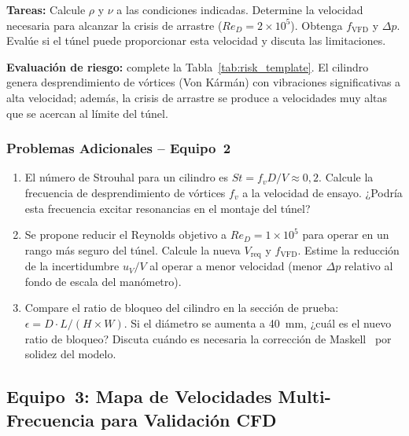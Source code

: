 \documentclass[12pt,a4paper]{article}
\begin{document}
\textbf{Tareas:} Calcule $\rho$ y $\nu$ a las condiciones indicadas.
Determine la velocidad necesaria para alcanzar la crisis de arrastre
($Re_D = 2\times10^5$).  Obtenga $f_\mathrm{VFD}$ y $\Delta p$.  Evalúe
si el túnel puede proporcionar esta velocidad y discuta las limitaciones.

\textbf{Evaluación de riesgo:} complete la Tabla~\ref{tab:risk_template}.
El cilindro genera desprendimiento de vórtices (Von Kármán) con vibraciones
significativas a alta velocidad; además, la crisis de arrastre se produce
a velocidades muy altas que se acercan al límite del túnel.

\subsubsection*{Problemas Adicionales -- Equipo~2}

\begin{enumerate}
	\item[\textbf{P2.1}] El número de Strouhal para un cilindro es
	      $St = f_v D / V \approx 0{,}2$.  Calcule la frecuencia de
	      desprendimiento de vórtices $f_v$ a la velocidad de ensayo.  ¿Podría
	      esta frecuencia excitar resonancias en el montaje del túnel?

	\item[\textbf{P2.2}] Se propone reducir el Reynolds objetivo a
	      $Re_D = 1\times10^5$ para operar en un rango más seguro del túnel.
	      Calcule la nueva $V_\mathrm{req}$ y $f_\mathrm{VFD}$.  Estime la
	      reducción de la incertidumbre $u_V/V$ al operar a menor velocidad
	      (menor $\Delta p$ relativo al fondo de escala del manómetro).

	\item[\textbf{P2.3}] Compare el ratio de bloqueo del cilindro en la
	      sección de prueba: $\epsilon = D \cdot L / (H \times W)$.  Si el
	      diámetro se aumenta a \SI{40}{\mm}, ¿cuál es el nuevo ratio de
	      bloqueo?  Discuta cuándo es necesaria la corrección de
	      Maskell~\cite{barlow1999} por solidez del modelo.
\end{enumerate}

\subsection{Equipo~3: Mapa de Velocidades Multi-Frecuencia para Validación CFD}
\label{sec:eq3}
\end{document}
